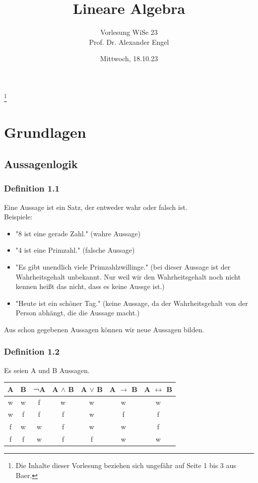 \documentclass{article}
\title{Lineare Algebra}
\author{Vorlesung WiSe 23 \\ Prof. Dr. Alexander Engel}
\begin{document}
\maketitle

\newpage 
\tableofcontents
\newpage

\date{Mittwoch, 18.10.23} \footnote[1]{Die Inhalte dieser Vorlesung beziehen sich ungefähr auf Seite 1 bis 3 aus Baer.}

\section{Grundlagen}
\subsection{Aussagenlogik}
\subsubsection*{Definition 1.1} Eine Aussage ist ein Satz, der entweder wahr oder falsch ist.\\
Beispiele:
\begin{itemize}
    \item "8 ist eine gerade Zahl." (wahre Aussage)
    \item "4 ist eine Primzahl." (falsche Aussage)
    \item "Es gibt unendlich viele Primzahlzwillinge." (bei dieser Aussage ist der Wahrheitsgehalt unbekannt. Nur weil wir den Wahrheitsgehalt noch nicht kennen heißt das nicht, dass es keine Aussge ist.)
    \item "Heute ist ein schöner Tag." (keine Aussage, da der Wahrheitsgehalt von der Person abhängt, die die Aussage macht.)
\end{itemize}

Aus schon gegebenen Aussagen können wir neue Aussagen bilden.
\subsubsection*{Definition 1.2}
Es seien A und B Aussagen. 

\begin{center}
    \begin{tabular}{|c|c|c|c|c|c|c|}
        \hline
        A & B & ¬A & A $\wedge$ B & A $\vee$ B & A $\rightarrow$ B & A $\leftrightarrow$ B \\
        \hline
        \hline
        w & w & f & w & w & w & w \\
        w & f & f & f & w & f & f \\
        f & w & w & f & w & w & f \\
        f & f & w & f & f & w & w \\
        \hline
    \end{tabular}
\end{center}
\end{document}

